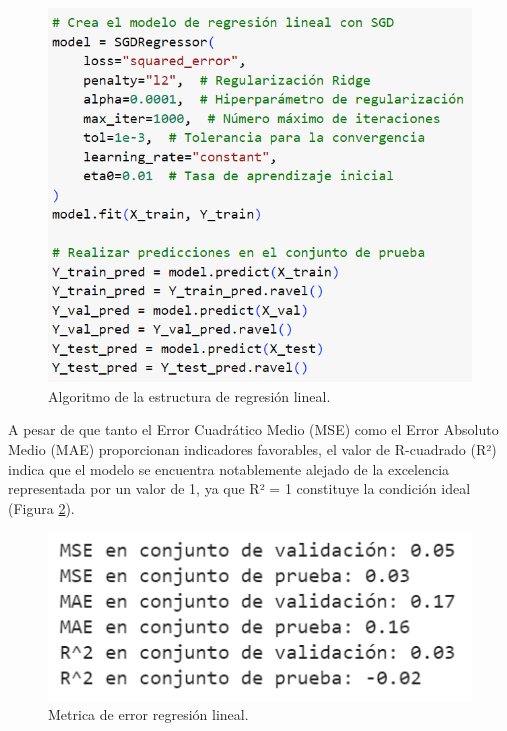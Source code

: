  

  \begin{figure}[H]
    \begin{center}
      \includegraphics[scale=0.50]{./regresion lineal estructura.png}
      \caption{Algoritmo de la estructura de regresión lineal.}
      \label{fig:estructura_lineal}
    \end{center}
  \end{figure}

  
A pesar de que tanto el Error Cuadrático Medio (MSE) como el Error Absoluto
Medio (MAE) proporcionan indicadores favorables, el valor de R-cuadrado (R²)
indica que el modelo se encuentra notablemente alejado de la excelencia
representada por un valor de 1, ya que R² = 1 constituye la condición ideal
(Figura \ref{fig:metricas_regresion}).

\begin{figure}[H]
  \begin{center}
    \includegraphics[scale=0.70]{./metricas de error REGRESION LINEAL.png}
    \caption{Metrica de error regresión lineal.}
    \label{fig:metricas_regresion}
  \end{center}
\end{figure}

